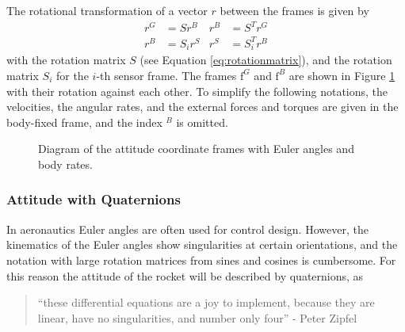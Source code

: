 The rotational transformation of a vector $r$ between the frames is given by
\begin{align}
    r^G &= S r^B & r^B &= S^T r^G \\
    r^B &= S_i r^{S} & r^{S} &= S_i^T r^B 
\end{align}
with the rotation matrix $S$ (see Equation \ref{eq:rotationmatrix}), and the rotation matrix $S_i$ for the $i$-th sensor frame.
The frames $\mathrm{f}^G$ and $\mathrm{f}^B$ are shown in Figure \ref{fig:model-frames} with their rotation against each other.
To simplify the following notations, the velocities, the angular rates, and the external forces and torques are given in the body-fixed frame, and the index $^B$ is omitted.  
\begin{figure}[ht]
    \centering
    \resizebox{0.36\textwidth}{!}{
    }
    \caption[Diagram of attitude frames]{Diagram of the attitude coordinate frames with Euler angles and body rates.}
    \label{fig:model-frames}
\end{figure}


\subsubsection{Attitude with Quaternions}
In aeronautics Euler angles are often used for control design.
However, the kinematics of the Euler angles show singularities at certain orientations, and the notation with large rotation matrices from sines and cosines is cumbersome.
For this reason the attitude of the rocket will be described by quaternions, as
\begin{quote}
``these differential equations are a joy to implement, because they are linear, have no singularities, and number only four'' - Peter Zipfel \cite{zipfel2007}
\end{quote}

